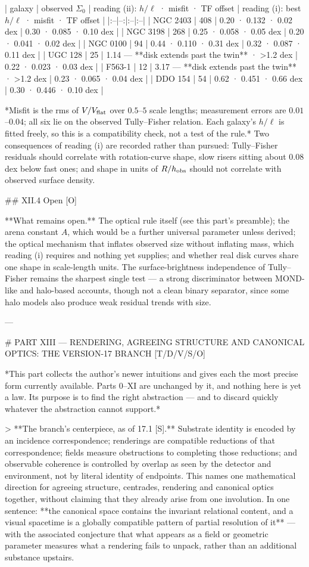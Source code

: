 | galaxy | observed $\Sigma_0$ | reading (ii): $h/\ell$ · misfit · TF offset | reading (i): best $h/\ell$ · misfit · TF offset |
|:--|--:|:--|:--|
| NGC 2403 | 408 | 0.20 · 0.132 · 0.02 dex | 0.30 · 0.085 · 0.10 dex |
| NGC 3198 | 268 | 0.25 · 0.058 · 0.05 dex | 0.20 · 0.041 · 0.02 dex |
| NGC 0100 | 94 | 0.44 · 0.110 · 0.31 dex | 0.32 · 0.087 · 0.11 dex |
| UGC 128 | 25 | 1.14 — **disk extends past the twin** · >1.2 dex | 0.22 · 0.023 · 0.03 dex |
| F563-1 | 12 | 3.17 — **disk extends past the twin** · >1.2 dex | 0.23 · 0.065 · 0.04 dex |
| DDO 154 | 54 | 0.62 · 0.451 · 0.66 dex | 0.30 · 0.446 · 0.10 dex |

*Misfit is the rms of $V/V_{\rm flat}$ over $0.5$–$5$ scale lengths; measurement errors are $0.01$–$0.04$; all six lie on the observed Tully–Fisher relation. Each galaxy's $h/\ell$ is fitted freely, so this is a compatibility check, not a test of the rule.* Two consequences of reading (i) are recorded rather than pursued: Tully–Fisher residuals should correlate with rotation-curve shape, slow risers sitting about $0.08$ dex below fast ones; and shape in units of $R/h_{\rm obs}$ should not correlate with observed surface density.

## XII.4 Open [O]

**What remains open.** The optical rule itself (see this part's preamble); the arena constant $A$, which would be a further universal parameter unless derived; the optical mechanism that inflates observed size without inflating mass, which reading (i) requires and nothing yet supplies; and whether real disk curves share one shape in scale-length units. The surface-brightness independence of Tully–Fisher remains the sharpest single test — a strong discriminator between MOND-like and halo-based accounts, though not a clean binary separator, since some halo models also produce weak residual trends with size.

---

# PART XIII — RENDERING, AGREEING STRUCTURE AND CANONICAL OPTICS: THE VERSION-17 BRANCH [T/D/V/S/O]

*This part collects the author's newer intuitions and gives each the most precise form currently available. Parts 0–XI are unchanged by it, and nothing here is yet a law. Its purpose is to find the right abstraction — and to discard quickly whatever the abstraction cannot support.*

> **The branch's centerpiece, as of 17.1 [S].** Substrate identity is encoded by an incidence correspondence; renderings are compatible reductions of that correspondence; fields measure obstructions to completing those reductions; and observable coherence is controlled by overlap as seen by the detector and environment, not by literal identity of endpoints. This names one mathematical direction for agreeing structure, centrades, rendering and canonical optics together, without claiming that they already arise from one involution. In one sentence: **the canonical space contains the invariant relational content, and a visual spacetime is a globally compatible pattern of partial resolution of it** — with the associated conjecture that what appears as a field or geometric parameter measures what a rendering fails to unpack, rather than an additional substance upstairs.

